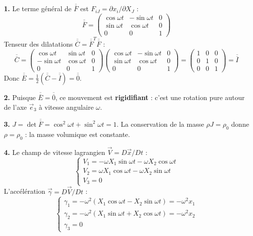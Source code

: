 \documentclass[12pt,a4paper]{article}
\begin{document}
\begin{boitecorrige}
\textbf{1.} Le terme général de $\overline{\overline{F}}$ est $F_{iJ} = \partial x_i/\partial X_J$ :
\[
\overline{\overline{F}} = \begin{pmatrix}\cos\omega t & -\sin\omega t & 0\\ \sin\omega t & \cos\omega t & 0\\ 0 & 0 & 1\end{pmatrix}
\]
Tenseur des dilatations $\overline{\overline{C}} = \overline{\overline{F}}^T\overline{\overline{F}}$ :
\[
\overline{\overline{C}} = \begin{pmatrix}\cos\omega t & \sin\omega t & 0\\ -\sin\omega t & \cos\omega t & 0\\ 0 & 0 & 1\end{pmatrix}\begin{pmatrix}\cos\omega t & -\sin\omega t & 0\\ \sin\omega t & \cos\omega t & 0\\ 0 & 0 & 1\end{pmatrix} = \begin{pmatrix}1&0&0\\0&1&0\\0&0&1\end{pmatrix} = \overline{\overline{I}}
\]
Donc $\overline{\overline{E}} = \frac{1}{2}(\overline{\overline{C}}-\overline{\overline{I}}) = \overline{\overline{0}}$.

\textbf{2.} Puisque $\overline{\overline{E}} = \overline{\overline{0}}$, ce mouvement est \textbf{rigidifiant} : c'est une rotation pure autour de l'axe $\vec{e}_3$ à vitesse angulaire $\omega$.

\textbf{3.} $J = \det\overline{\overline{F}} = \cos^2\omega t + \sin^2\omega t = 1$. La conservation de la masse $\rho J = \rho_0$ donne $\rho = \rho_0$ : la masse volumique est constante.

\textbf{4.} Le champ de vitesse lagrangien $\vec{V} = D\vec{x}/Dt$ :
\[
\begin{cases}
V_1 = -\omega X_1\sin\omega t - \omega X_2\cos\omega t\\
V_2 = \omega X_1\cos\omega t - \omega X_2\sin\omega t\\
V_3 = 0
\end{cases}
\]
L'accélération $\vec{\gamma} = D\vec{V}/Dt$ :
\[
\begin{cases}
\gamma_1 = -\omega^2(X_1\cos\omega t - X_2\sin\omega t) = -\omega^2 x_1\\
\gamma_2 = -\omega^2(X_1\sin\omega t + X_2\cos\omega t) = -\omega^2 x_2\\
\gamma_3 = 0
\end{cases}
\]


\end{boitecorrige}
\end{document}

